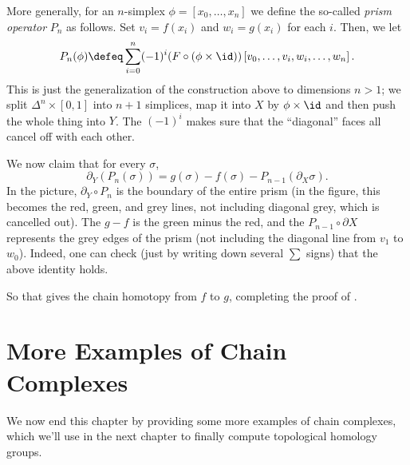 More generally, for an $n$-simplex $\phi = [x_0, \dots, x_n]$
we define the so-called \emph{prism operator} $P_n$
as follows. Set $v_i = f(x_i)$ and $w_i = g(x_i)$ for each $i$.
Then, we let
\[ P_n(\phi) \defeq \sum_{i=0}^n (-1)^i (F \circ (\phi\times\id))
	\left[ v_0, \dots, v_i, w_i, \dots, w_n \right]. \]
This is just the generalization of the construction above to dimensions $n > 1$;
we split $\Delta^n \times [0,1]$ into $n+1$ simplices,
map it into $X$ by $\phi \times \id$ and then push the whole thing into $Y$.
The $(-1)^i$ makes sure that the ``diagonal'' faces all cancel off with each other.

We now claim that for every $\sigma$,
\[ \partial_Y(P_n(\sigma)) = g(\sigma) - f(\sigma) - P_{n-1}(\partial_X\sigma). \]
In the picture, $\partial_Y \circ P_n$ is the boundary of the entire prism
(in the figure, this becomes the red, green, and grey lines, not including diagonal grey,
which is cancelled out).
The $g-f$ is the green minus the red,
and the $P_{n-1} \circ \partial X$ represents the grey edges of the prism
(not including the diagonal line from $v_1$ to $w_0$).
Indeed, one can check (just by writing down several $\sum$ signs)
that the above identity holds.

So that gives the chain homotopy from $f$ to $g$, completing the proof of .

\section{More Examples of Chain Complexes}
We now end this chapter by providing some more examples of chain complexes,
which we'll use in the next chapter to finally compute topological homology groups.

